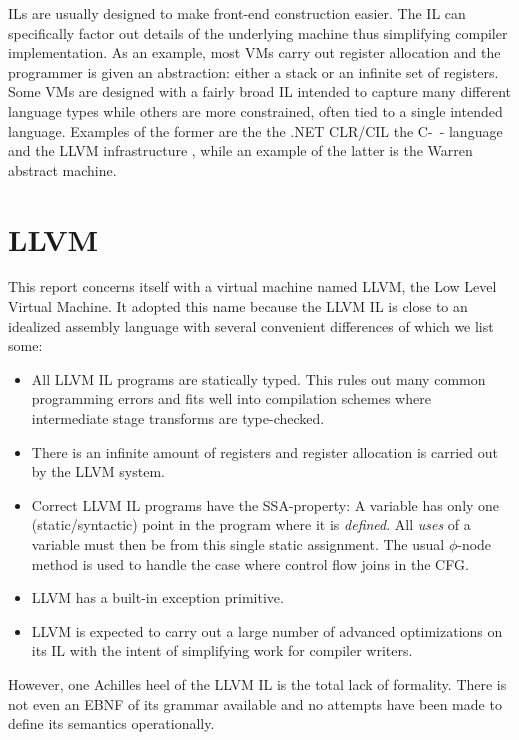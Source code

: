 \documentclass[a4paper, oneside, 10pt, draft]{memoir}
\begin{document}
ILs are usually designed to make front-end construction easier. The IL
can specifically factor out details of the underlying machine thus
simplifying compiler implementation. As an example, most VMs carry out
register allocation and the programmer is given an abstraction: either
a stack or an infinite set of registers. Some VMs are designed with a
fairly broad IL intended to capture many different language types
while others are more constrained, often tied to a single intended
language. Examples of the former are the the .NET
CLR/CIL\cite{ecma:2006:335} the C-\ - language\cite{http:cminmin} and
the LLVM infrastructure \cite{lattner.ea:2009:llvm-ref}, while an
example of the latter is the Warren abstract
machine\cite{warren:1983:prolog}.

\section{LLVM}

This report concerns itself with a virtual machine named LLVM, the Low
Level Virtual Machine. It adopted this name because the LLVM IL is
close to an idealized assembly language with several convenient
differences of which we list some:
\begin{itemize}
\item All LLVM IL programs are statically typed. This rules out many
  common programming errors and fits well into compilation schemes
  where intermediate stage transforms are type-checked.
\item There is an infinite amount of registers and register allocation
  is carried out by the LLVM system.
\item Correct LLVM IL programs have the SSA-property: A variable has
  only one (static/syntactic) point in the program where it is
  \emph{defined}. All \emph{uses} of a variable must then be from this
  single static assignment. The usual $\phi$-node method is used to
  handle the case where control flow joins in the CFG.
\item LLVM has a built-in exception primitive.
\item LLVM is expected to carry out a large number of advanced
  optimizations on its IL with the intent of simplifying work for
  compiler writers.
\end{itemize}

However, one Achilles heel of the LLVM IL is the total lack of
formality. There is not even an EBNF of its grammar available and no
attempts have been made to define its semantics operationally.
\end{document}

